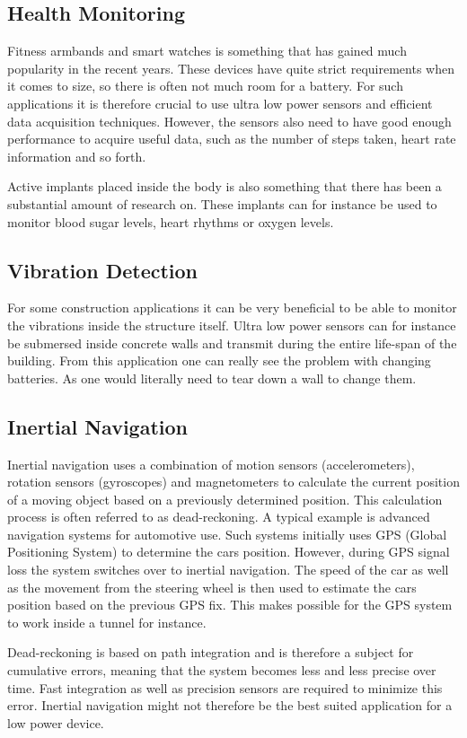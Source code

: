 \subsection{Health Monitoring}

Fitness armbands and smart watches is something that has gained much popularity in the recent years. These devices have quite strict requirements when it comes to size, so there is often not much room for a battery. For such applications it is therefore crucial to use ultra low power sensors and efficient data acquisition techniques. However, the sensors also need to have good enough performance to acquire useful data, such as the number of steps taken, heart rate information and so forth.  

Active implants placed inside the body is also something that there has been a substantial amount of research on. These implants can for instance be used to monitor blood sugar levels, heart rhythms or oxygen levels. 

\subsection{Vibration Detection}

For some construction applications it can be very beneficial to be able to monitor the vibrations inside the structure itself. Ultra low power sensors can for instance be submersed inside concrete walls and transmit during the entire life-span of the building. From this application one can really see the problem with changing batteries. As one would literally need to tear down a wall to change them. 

\subsection{Inertial Navigation}

Inertial navigation uses a combination of motion sensors (accelerometers), rotation sensors (gyroscopes) and magnetometers to calculate the current position of a moving object based on a previously determined position. This calculation process is often referred to as dead-reckoning. A typical example is advanced navigation systems for automotive use. Such systems initially uses GPS (Global Positioning System) to determine the cars position. However, during GPS signal loss the system switches over to inertial navigation. The speed of the car as well as the movement from the steering wheel is then used to estimate the cars position based on the previous GPS fix. This makes possible for the GPS system to work inside a tunnel for instance. 

Dead-reckoning is based on path integration and is therefore a subject for cumulative errors, meaning that the system becomes less and less precise over time. Fast integration as well as precision sensors are required to minimize this error. Inertial navigation might not therefore be the best suited application for a low power device. 
